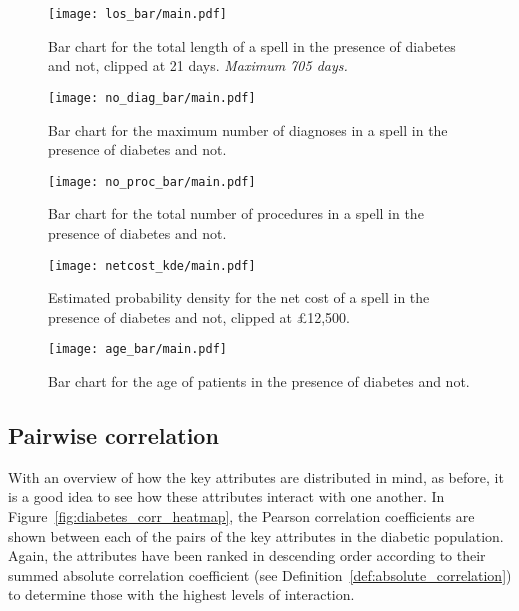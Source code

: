 \begin{figure}[htbp]
    \texttt{[image: los\_bar/main.pdf]}
    \caption{Bar chart for the total length of a spell in the presence of
        diabetes and not, clipped at 21 days. \textit{Maximum 705 days.}}%
    \label{fig:diabetes_los_bar}
\end{figure}

\begin{figure}[htbp]
    \centering
    \texttt{[image: no\_diag\_bar/main.pdf]}
    \caption{Bar chart for the maximum number of diagnoses in a spell in the
        presence of diabetes and not.}%
    \label{fig:diabetes_no_diag_bar}
\end{figure}

\begin{figure}[htbp]
    \centering
    \texttt{[image: no\_proc\_bar/main.pdf]}
    \caption{Bar chart for the total number of procedures in a spell in the
        presence of diabetes and not.}%
    \label{fig:diabetes_no_proc_bar}
\end{figure}

\begin{figure}[htbp]
    \centering
    \texttt{[image: netcost\_kde/main.pdf]}
    \caption{Estimated probability density for the net cost of a spell in the
        presence of diabetes and not, clipped at \pounds12,500.}%
    \label{fig:diabetes_netcost_kde}
\end{figure}

\begin{figure}[htbp]
    \centering
    \texttt{[image: age\_bar/main.pdf]}
    \caption{Bar chart for the age of patients in the presence of diabetes and
        not.}%
    \label{fig:diabetes_age_bar}
\end{figure}

\subsection{Pairwise correlation}\label{subsec:diabetes_correlation}

With an overview of how the key attributes are distributed in mind, as before,
it is a good idea to see how these attributes interact with one another. In
Figure~\ref{fig:diabetes_corr_heatmap}, the Pearson correlation coefficients
are shown between each of the pairs of the key attributes in the diabetic
population. Again, the attributes have been ranked in descending order according
to their summed absolute correlation coefficient (see
Definition~\ref{def:absolute_correlation}) to determine those with the highest
levels of interaction.

